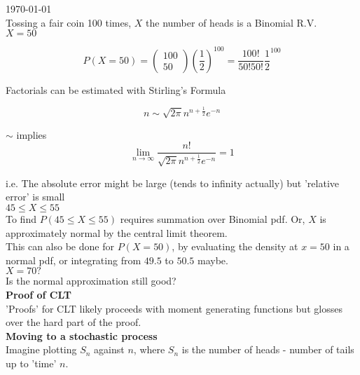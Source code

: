 \chapter{}

\today \\

Tossing a fair coin 100 times, $X$ the number of heads is a Binomial R.V. \\

\textbf{$X = 50$}

\[
   P(X = 50) = \begin{pmatrix} 100 \\ 50 \end{pmatrix} \left( \frac{1}{2} \right)^{100} = \frac{100!}{50! 50!} \frac{1}{2}^{100}
\] 

Factorials can be estimated with Stirling's Formula

\[
   n \sim \sqrt{2\pi} n^{n + \frac{1}{2}} e^{-n}
\] 

$\sim$ implies
\[
   \lim_{n \to \infty} \frac{n!}{\sqrt{2\pi} n^{n + \frac{1}{2}} e^{-n}} = 1
\] 

i.e. The absolute error might be large (tends to infinity actually) but 'relative error' is small \\

\textbf{$45 \leq X \leq 55$} \\

To find $P(45 \leq X \leq 55)$ requires summation over Binomial pdf. Or, $X$ is approximately normal by the central limit theorem. \\

 This can also be done for $P(X = 50)$, by evaluating the density at $x= 50$ in a normal pdf, or integrating from $49.5$ to $50.5$ maybe.  \\

\textbf{$X = 70?$} \\

Is the normal approximation still good?\\

\textbf{Proof of CLT} \\

'Proofs' for CLT likely proceeds with moment generating functions but glosses over the hard part of the proof.  \\

\textbf{Moving to a stochastic process} \\

Imagine plotting $S_n$ against $n$, where $S_n$ is the number of heads - number of tails up to 'time' $n$.  \\

